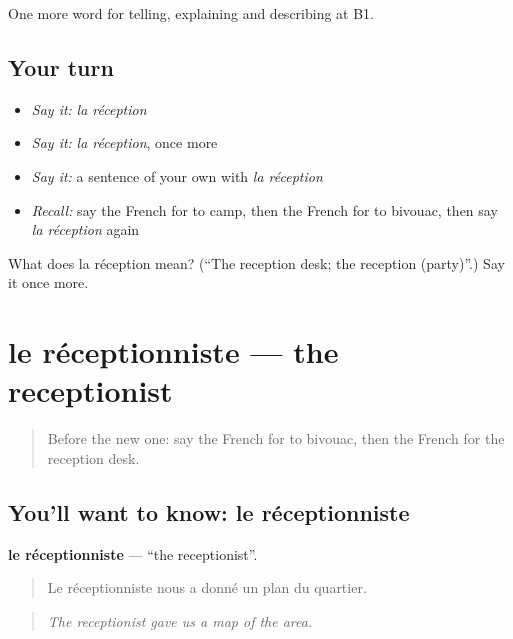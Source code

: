 \begin{grammarlens}[title={What you've built}]
One more word for telling, explaining and describing at B1.
\end{grammarlens}

\subsection*{Your turn}
\begin{itemize}
\raggedright
  \item \emph{Say it:} \emph{la réception}
  \item \emph{Say it:} \emph{la réception}, once more
  \item \emph{Say it:} a sentence of your own with \emph{la réception}
  \item \emph{Recall:} say the French for to camp, then the French for to bivouac, then say \emph{la réception} again
\end{itemize}

\begin{tcolorbox}[breakable,colback=teal!4,colframe=teal!35!black,title={Before you move on}]
What does la réception mean? (\textquotedblleft{}The reception desk; the reception (party)\textquotedblright{}.) Say it once more.
\end{tcolorbox}
\section[le réceptionniste]{le réceptionniste — the receptionist}

\label{lesson:FR-C426-receptionniste}



\begin{quote}
Before the new one: say the French for to bivouac, then the French for the reception desk.
\end{quote}

\subsection*{You'll want to know: le réceptionniste}
\textbf{le réceptionniste} — \textquotedblleft{}the receptionist\textquotedblright{}.

\begin{quote}
Le réceptionniste nous a donné un plan du quartier.
\end{quote}

\begin{quote}
\emph{The receptionist gave us a map of the area.}
\end{quote}

